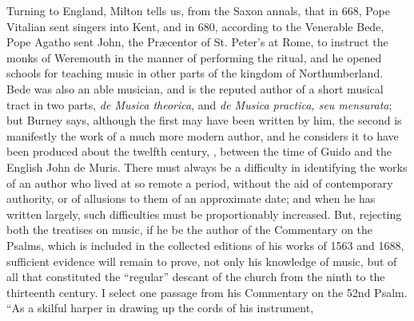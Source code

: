 


\renewcommand\rectoheader{anglo-saxon music.}



Turning to England, Milton tells us, from the Saxon annals, that in 668, 
Pope Vitalian sent singers into Kent, and in 680, according to the Venerable
Bede, %
Pope Agatho sent John, the Præcentor of St. Peter’s at Rome, to
instruct the monks of Weremouth in the manner of performing the ritual, and he
opened schools for teaching music in other parts of the kingdom of Northumberland.
Bede was also an able musician, and is the reputed author of a short
musical tract in two parts, \textit{de Musica theorica}, and \textit{de Musica practica, seu mensurata};
but Burney says, although the first may have been written by him, the
second is manifestly the work of a much more modern author, and he considers it
to have been produced about the twelfth century, \ie, between the time of Guido
and the English John de Muris. There must always be a difficulty in identifying
the works of an author who lived at so remote a period, without the aid of
contemporary authority, or of allusions to them of an approximate date; and when
he has written largely, such difficulties must be proportionably increased. But,
rejecting both the treatises on music, if he be the author of the Commentary on
the Psalms, which is included in the collected editions of his works of 1563
and 1688, sufficient evidence will remain to prove, not only his knowledge of
music, but of all that constituted the “regular” descant of the church from the
ninth to the thirteenth century. I select one passage from his Commentary on
the 52nd Psalm. “As a skilful harper in drawing up the cords of his instrument,
